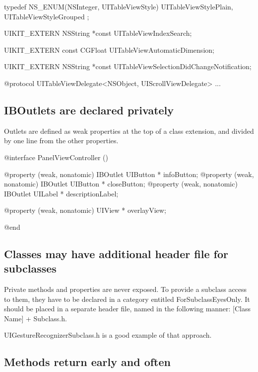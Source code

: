 \documentclass[10pt]{extarticle}
\newenvironment{codelisting}
{\footnotesize\mdframed[middlelinewidth=0.5pt, middlelinecolor=BaliHaiColor, skipabove=15pt]\verbatim}
{\endverbatim\endmdframed\vspace{12pt}\normalsize}
\newenvironment{tiplisting}
{\small\mdframed[middlelinewidth=0.5pt, middlelinecolor=GoldenDreamColor, skipabove=15pt]{\textbf{Tip:}}}
{\endmdframed\vspace{12pt}\normalsize}
\begin{document}
\begin{codelisting}
typedef NS_ENUM(NSInteger, UITableViewStyle) {
    UITableViewStylePlain,
    UITableViewStyleGrouped
};

UIKIT_EXTERN NSString *const UITableViewIndexSearch;

UIKIT_EXTERN const CGFloat UITableViewAutomaticDimension;

UIKIT_EXTERN NSString *const UITableViewSelectionDidChangeNotification;

@protocol UITableViewDelegate<NSObject, UIScrollViewDelegate>
...
\end{codelisting}

\subsection{IBOutlets are declared privately}

Outlets are defined as weak properties at the top of a class extension, and divided by one line from the other properties.

\begin{codelisting}
@interface PanelViewController ()

@property (weak, nonatomic) IBOutlet UIButton * infoButton;
@property (weak, nonatomic) IBOutlet UIButton * closeButton;
@property (weak, nonatomic) IBOutlet UILabel * descriptionLabel;

@property (weak, nonatomic) UIView * overlayView;

@end
\end{codelisting}


\subsection{Classes may have additional header file for subclasses}

Private methods and properties are never exposed. To provide a subclass access to them, they have to be declared in a category entitled ForSubclassEyesOnly. It should be placed in a separate header file, named in the following manner: [Class Name] + Subclass.h. 

\begin{tiplisting}
UIGestureRecognizerSubclass.h is a good example of that approach.
\end{tiplisting}


\subsection{Methods return early and often}
\end{document}
